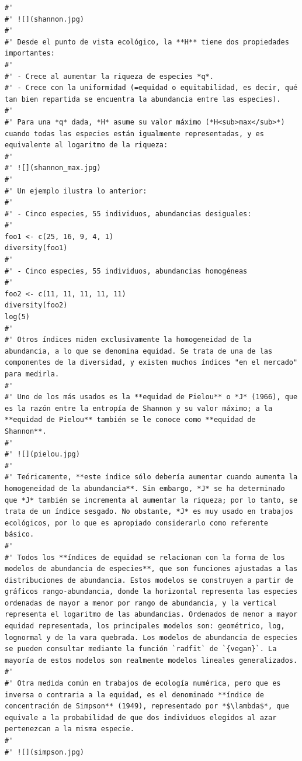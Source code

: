 \documentclass[11pt,]{article}
\begin{document}
\begin{verbatim}
#' 
#' ![](shannon.jpg)
#' 
#' Desde el punto de vista ecológico, la **H** tiene dos propiedades importantes:
#' 
#' - Crece al aumentar la riqueza de especies *q*.
#' - Crece con la uniformidad (=equidad o equitabilidad, es decir, qué tan bien repartida se encuentra la abundancia entre las especies).
#' 
#' Para una *q* dada, *H* asume su valor máximo (*H<sub>max</sub>*) cuando todas las especies están igualmente representadas, y es equivalente al logaritmo de la riqueza:
#' 
#' ![](shannon_max.jpg)
#' 
#' Un ejemplo ilustra lo anterior:
#' 
#' - Cinco especies, 55 individuos, abundancias desiguales:
#' 
foo1 <- c(25, 16, 9, 4, 1)
diversity(foo1)
#' 
#' - Cinco especies, 55 individuos, abundancias homogéneas
#' 
foo2 <- c(11, 11, 11, 11, 11)
diversity(foo2)
log(5)
#' 
#' Otros índices miden exclusivamente la homogeneidad de la abundancia, a lo que se denomina equidad. Se trata de una de las componentes de la diversidad, y existen muchos índices "en el mercado" para medirla.
#' 
#' Uno de los más usados es la **equidad de Pielou** o *J* (1966), que es la razón entre la entropía de Shannon y su valor máximo; a la **equidad de Pielou** también se le conoce como **equidad de Shannon**.
#'  
#' ![](pielou.jpg)
#'
#' Teóricamente, **este índice sólo debería aumentar cuando aumenta la homogeneidad de la abundancia**. Sin embargo, *J* se ha determinado que *J* también se incrementa al aumentar la riqueza; por lo tanto, se trata de un índice sesgado. No obstante, *J* es muy usado en trabajos ecológicos, por lo que es apropiado considerarlo como referente básico.
#' 
#' Todos los **índices de equidad se relacionan con la forma de los modelos de abundancia de especies**, que son funciones ajustadas a las distribuciones de abundancia. Estos modelos se construyen a partir de gráficos rango-abundancia, donde la horizontal representa las especies ordenadas de mayor a menor por rango de abundancia, y la vertical representa el logaritmo de las abundancias. Ordenados de menor a mayor equidad representada, los principales modelos son: geométrico, log, lognormal y de la vara quebrada. Los modelos de abundancia de especies se pueden consultar mediante la función `radfit` de `{vegan}`. La mayoría de estos modelos son realmente modelos lineales generalizados.
#' 
#' Otra medida común en trabajos de ecología numérica, pero que es inversa o contraria a la equidad, es el denominado **índice de concentración de Simpson** (1949), representado por *$\lambda$*, que equivale a la probabilidad de que dos individuos elegidos al azar pertenezcan a la misma especie.
#' 
#' ![](simpson.jpg)

\end{verbatim}
\end{document}
